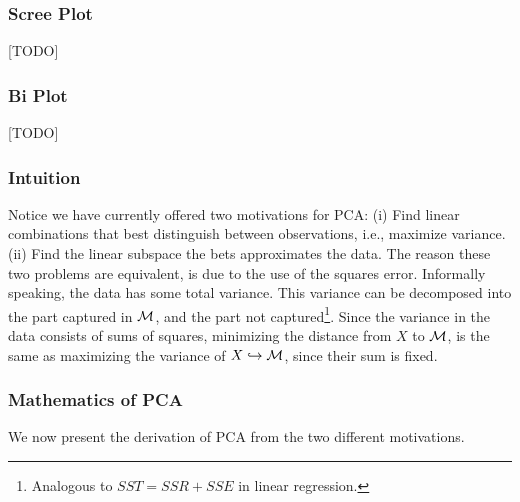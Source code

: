 \subsubsection{Scree Plot}
\label{sec:scree_plot}
[TODO]



\subsubsection{Bi Plot}
\label{sec:bi_plot}
[TODO]



\subsubsection{Intuition}
\label{sec:pca_intuition}

Notice we have currently offered two motivations for PCA: 
(i) Find linear combinations that best distinguish between observations, i.e., maximize variance. 
(ii) Find the linear subspace the bets approximates the data.
The reason these two problems are equivalent, is due to the use of the squares error.
Informally speaking, the data has some total variance. This variance can be decomposed into the part captured in $\mathcal{M}$, and the part not captured\footnote{Analogous to $SST=SSR+SSE$ in linear regression.}. 
Since the variance in the data consists of sums of squares, minimizing the distance from $X$ to $\mathcal{M}$, is the same as maximizing the variance of $X \hookrightarrow \mathcal{M}$, since their sum is fixed.



\subsubsection{Mathematics of PCA}
\label{sec:pca_mathematics}
We now present the derivation of PCA from the two different motivations.




